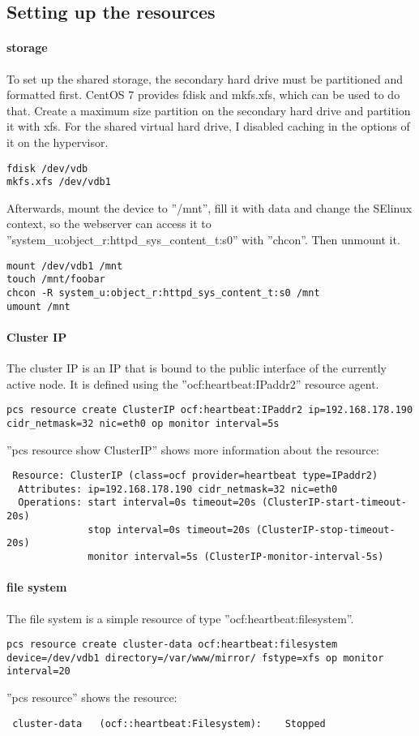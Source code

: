 \subsection{Setting up the resources}
\paragraph{storage}
To set up the shared storage, the secondary hard drive must be partitioned
and formatted first. CentOS 7 provides fdisk and mkfs.xfs, which
can be used to do that. Create a maximum size partition on the secondary hard drive
and partition it with xfs. For the shared virtual hard drive, I disabled caching in
the options of it on the hypervisor.
\begin{lstlisting}
fdisk /dev/vdb
mkfs.xfs /dev/vdb1
\end{lstlisting}
Afterwards, mount the device to ''/mnt'', fill it with data and change the SElinux context, so the 
webserver can access it to ''system\_u:object\_r:httpd\_sys\_content\_t:s0'' with ''chcon''.
Then unmount it.
\begin{lstlisting}
mount /dev/vdb1 /mnt
touch /mnt/foobar
chcon -R system_u:object_r:httpd_sys_content_t:s0 /mnt
umount /mnt
\end{lstlisting}
\paragraph{Cluster IP}
The cluster IP is an IP that is bound to the public interface of the currently
active node.
It is defined using the ''ocf:heartbeat:IPaddr2'' resource agent.
\begin{lstlisting}
pcs resource create ClusterIP ocf:heartbeat:IPaddr2 ip=192.168.178.190 cidr_netmask=32 nic=eth0 op monitor interval=5s
\end{lstlisting}
''pcs resource show ClusterIP'' shows more information about the resource:
\begin{lstlisting}
 Resource: ClusterIP (class=ocf provider=heartbeat type=IPaddr2)
  Attributes: ip=192.168.178.190 cidr_netmask=32 nic=eth0 
  Operations: start interval=0s timeout=20s (ClusterIP-start-timeout-20s)
              stop interval=0s timeout=20s (ClusterIP-stop-timeout-20s)
              monitor interval=5s (ClusterIP-monitor-interval-5s)
\end{lstlisting}
\paragraph{file system}
The file system is a simple resource of type ''ocf:heartbeat:filesystem''.
\begin{lstlisting}
pcs resource create cluster-data ocf:heartbeat:filesystem device=/dev/vdb1 directory=/var/www/mirror/ fstype=xfs op monitor interval=20
\end{lstlisting}
''pcs resource'' shows the resource:
\begin{lstlisting}
 cluster-data	(ocf::heartbeat:Filesystem):	Stopped 
\end{lstlisting}
